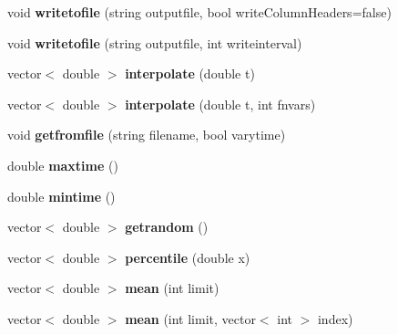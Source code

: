 \begin{DoxyCompactItemize}
\mbox{\label{class_c_b_t_c_set_aa89299bec4da30af528bf39281b0f1bb}} 
void {\bfseries writetofile} (string outputfile, bool write\+Column\+Headers=false)
\item 
\mbox{\label{class_c_b_t_c_set_a94eff12322a68e906f635a53349680a3}} 
void {\bfseries writetofile} (string outputfile, int writeinterval)
\item 
\mbox{\label{class_c_b_t_c_set_add723abb6e55504aae2fc46e9702c282}} 
vector$<$ double $>$ {\bfseries interpolate} (double t)
\item 
\mbox{\label{class_c_b_t_c_set_a5bc56c2f0ef03bd3e1396be4822a1815}} 
vector$<$ double $>$ {\bfseries interpolate} (double t, int fnvars)
\item 
\mbox{\label{class_c_b_t_c_set_a4829d4f1146668caf3c40db2d743d1a1}} 
void {\bfseries getfromfile} (string filename, bool varytime)
\item 
\mbox{\label{class_c_b_t_c_set_a9bac0d2c7a0d1d7e0279cb0130b077e1}} 
double {\bfseries maxtime} ()
\item 
\mbox{\label{class_c_b_t_c_set_a5e26736c0db94eafd1085a1315a4df58}} 
double {\bfseries mintime} ()
\item 
\mbox{\label{class_c_b_t_c_set_aad1afd9f646208f62240d0ad93c2b0dc}} 
vector$<$ double $>$ {\bfseries getrandom} ()
\item 
\mbox{\label{class_c_b_t_c_set_a743de12722b0d8c245be4dbc8bf9e0b6}} 
vector$<$ double $>$ {\bfseries percentile} (double x)
\item 
\mbox{\label{class_c_b_t_c_set_a5af90fa47e0b1c0e53756ff1481ae1d3}} 
vector$<$ double $>$ {\bfseries mean} (int limit)
\item 
\mbox{\label{class_c_b_t_c_set_ae02da44fa6e334be3b092e6520397145}} 
vector$<$ double $>$ {\bfseries mean} (int limit, vector$<$ int $>$ index)
\item 

\end{DoxyCompactItemize}
